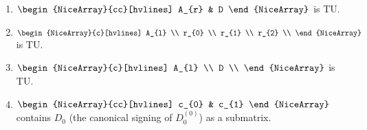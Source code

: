 \begin{lemma}
\begin{enumerate}
        \item\label{item:three_sum_canonical_signing_TU_A_r_D} $\begin{NiceArray}{cc}[hvlines] A_{r} & D \end{NiceArray}$ is TU.
        \item\label{item:three_sum_canonical_signing_TU_A_l_rs} $\begin{NiceArray}{c}[hvlines] A_{l} \\ r_{0} \\ r_{1} \\ r_{2} \\ \end{NiceArray}$ is TU.
        \item\label{item:three_sum_canonical_signing_TU_A_l_D} $\begin{NiceArray}{c}[hvlines] A_{l} \\ D \\ \end{NiceArray}$ is TU.
        \item $\begin{NiceArray}{cc}[hvlines] c_{0} & c_{1} \end{NiceArray}$ contains $D_{0}$ (the canonical signing of $D_{0}^{(0)}$) as a submatrix.
    \end{enumerate}
\end{lemma}

